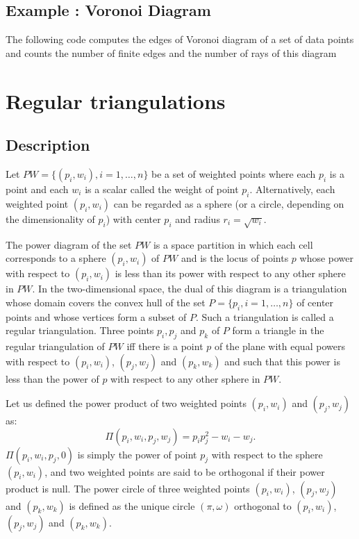 \subsection{Example : Voronoi Diagram}
\label{Subsection_2D_Triangulations_Voronoi}
The following code computes the edges of Voronoi diagram
of a set of data points
and counts  the number of finite edges and the number of rays
of this diagram


\section{Regular triangulations}
\label{Section_2D_Triangulations_Regular}

\subsection{Description}
\label{Subsection_2D_Triangulations_Regular_Description}
Let ${  PW} = \{(p_i, w_i), i = 1, \ldots , n \}$ be a set of 
weighted points where each $p_i$ is a point and each $w_i$
is a scalar called the weight of point $p_i$.
Alternatively, each weighted point $(p_i, w_i)$ can be regarded
as a sphere (or a circle, depending on the dimensionality
of $p_i$)  with center $p_i$ and radius $r_i=\sqrt{w_i}$.

The power diagram of the set ${  PW}$ is a space partition in which
 each cell corresponds to a sphere $(p_i, w_i)$ of ${  PW}$
and is the locus of points  $p$ whose power with respect to $(p_i, w_i)$
is less than its power with respect to any other sphere 
in ${  PW}$. In the two-dimensional space,
the dual of this diagram is a triangulation 
whose domain covers the convex hull of the set 
${  P}= \{ p_i, i = 1, \ldots , n \}$ of center points
and whose vertices form a subset of ${  P}$.
Such a triangulation is called a regular triangulation.
Three points $p_i, p_j$ and $p_k$ of ${  P}$
form a triangle in the regular triangulation of ${  PW}$
iff there is a point $p$ of the plane with equal 
powers with respect to $(p_i, w_i)$, $(p_j, w_j)$
and $(p_k, w_k)$ and such that this power 
is  less than the power of $p$
with respect to any other sphere in  ${  PW}$.

Let us defined the power product of two weighted points
$(p_i, w_i)$ and $(p_j, w_j)$ as:
\[\Pi(p_i, w_i,p_j, w_j) = p_ip_j ^2 - w_i  - w_j  .\]
$\Pi(p_i, w_i,p_j, 0)$ is simply the power of point $p_j$
with respect to the sphere $(p_i, w_i)$, and two weighted points 
are said to be orthogonal if their power product is null.
The power circle of three weighted points
 $(p_i, w_i)$, $(p_j, w_j)$
and $(p_k, w_k)$ is defined as the unique circle
$(\pi, \omega)$  orthogonal to
 $(p_i, w_i)$, $(p_j, w_j)$
and $(p_k, w_k)$.


